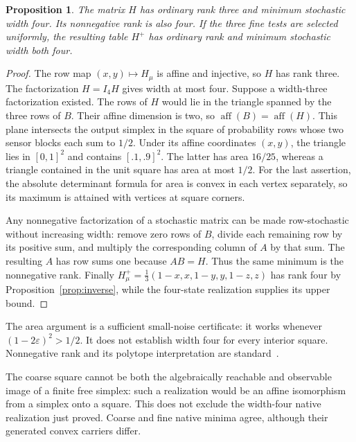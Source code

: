 \documentclass[11pt]{article}
\newtheorem{proposition}[theorem]{Proposition}
\theoremstyle{definition}
\newcommand{\eps}{\varepsilon}
\begin{document}
\begin{proposition}\label{prop:width}
The matrix $H$ has ordinary rank three and minimum stochastic width four. Its nonnegative rank is also four. If the three fine tests are selected uniformly, the resulting table $H^+$ has ordinary rank and minimum stochastic width both four.
\end{proposition}
\begin{proof}
The row map $(x,y)\mapsto H_\mu$ is affine and injective, so $H$ has rank three. The factorization $H=I_4H$ gives width at most four. Suppose a width-three factorization existed. The rows of $H$ would lie in the triangle spanned by the three rows of $B$. Their affine dimension is two, so $\operatorname{aff}(B)=\operatorname{aff}(H)$. This plane intersects the output simplex in the square of probability rows whose two sensor blocks each sum to $1/2$. Under its affine coordinates $(x,y)$, the triangle lies in $[0,1]^2$ and contains $[.1,.9]^2$. The latter has area $16/25$, whereas a triangle contained in the unit square has area at most $1/2$. For the last assertion, the absolute determinant formula for area is convex in each vertex separately, so its maximum is attained with vertices at square corners.

Any nonnegative factorization of a stochastic matrix can be made row-stochastic without increasing width: remove zero rows of $B$, divide each remaining row by its positive sum, and multiply the corresponding column of $A$ by that sum. The resulting $A$ has row sums one because $AB=H$. Thus the same minimum is the nonnegative rank. Finally
$H^+_\mu=\tfrac13(1-x,x,1-y,y,1-z,z)$ has rank four by Proposition~\ref{prop:inverse}, while the four-state realization supplies its upper bound.
\end{proof}
The area argument is a sufficient small-noise certificate: it works whenever $(1-2\eps)^2>1/2$. It does not establish width four for every interior square. Nonnegative rank and its polytope interpretation are standard~\cite{CohenRothblum}.

The coarse square cannot be both the algebraically reachable and observable image of a finite free simplex: such a realization would be an affine isomorphism from a simplex onto a square. This does not exclude the width-four native realization just proved. Coarse and fine native minima agree, although their generated convex carriers differ.
\end{document}

